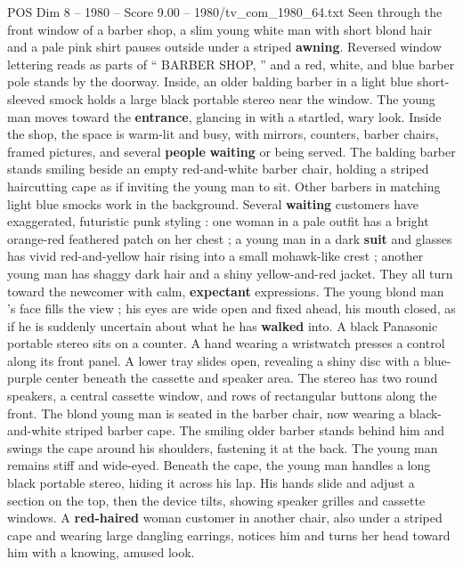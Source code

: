 \begin{textsample}{POS Dim 8 – 1980 – Score 9.00 – 1980/tv\_com\_1980\_64.txt}  \label{ex:f8_pos_042}
Seen through the front window of a barber shop, a slim young white man with short blond hair and a pale pink shirt pauses outside under a striped \textbf{awning}.
Reversed window lettering reads as parts of “ BARBER SHOP, ” and a red, white, and blue barber pole stands by the doorway.
Inside, an older balding barber in a light blue short-sleeved smock holds a large black portable stereo near the window.
The young man moves toward the \textbf{entrance}, glancing in with a startled, wary look.
Inside the shop, the space is warm-lit and busy, with mirrors, counters, barber chairs, framed pictures, and several \textbf{people} \textbf{waiting} or being served.
The balding barber stands smiling beside an empty red-and-white barber chair, holding a striped haircutting cape as if inviting the young man to sit.
Other barbers in matching light blue smocks work in the background.
Several \textbf{waiting} customers have exaggerated, futuristic punk styling : one woman in a pale outfit has a bright orange-red feathered patch on her chest ; a young man in a dark \textbf{suit} and glasses has vivid red-and-yellow hair rising into a small mohawk-like crest ; another young man has shaggy dark hair and a shiny yellow-and-red jacket.
They all turn toward the newcomer with calm, \textbf{expectant} expressions.
The young blond man ’s face fills the view ; his eyes are wide open and fixed ahead, his mouth closed, as if he is suddenly uncertain about what he has \textbf{walked} into.
A black Panasonic portable stereo sits on a counter.
A hand wearing a wristwatch presses a control along its front panel.
A lower tray slides open, revealing a shiny disc with a blue-purple center beneath the cassette and speaker area.
The stereo has two round speakers, a central cassette window, and rows of rectangular buttons along the front.
The blond young man is seated in the barber chair, now wearing a black-and-white striped barber cape.
The smiling older barber stands behind him and swings the cape around his shoulders, fastening it at the back.
The young man remains stiff and wide-eyed.
Beneath the cape, the young man handles a long black portable stereo, hiding it across his lap.
His hands slide and adjust a section on the top, then the device tilts, showing speaker grilles and cassette windows.
A \textbf{red-haired} woman customer in another chair, also under a striped cape and wearing large dangling earrings, notices him and turns her head toward him with a knowing, amused look.

\end{textsample}
